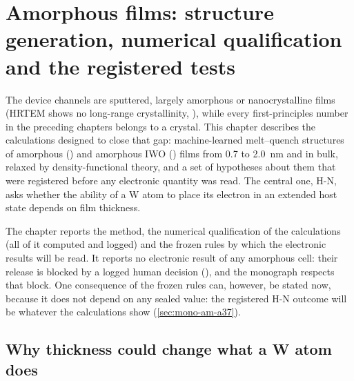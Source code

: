 \chapter{Amorphous films: structure generation, numerical qualification and the registered tests}
\label{ch:mono-amorph}

The device channels are sputtered, largely amorphous or nanocrystalline films (HRTEM shows no long-range crystallinity, \citealp[p.~2]{Januar2026}), while every
first-principles number in the preceding chapters belongs to a crystal. This chapter describes the calculations
designed to close that gap: machine-learned melt--quench structures of amorphous \InO{} (\aIO) and amorphous IWO
(\aIWO) films from 0.7 to 2.0~nm and in bulk, relaxed by density-functional theory, and a set of hypotheses about them
that were registered before any electronic quantity was read. The central one, H-N, asks whether the ability of a W
atom to place its electron in an extended host state depends on film thickness.

The chapter reports the method, the numerical qualification of the calculations (all of it computed and logged) and
the frozen rules by which the electronic results will be read. It reports no electronic result of any amorphous cell:
their release is blocked by a logged human decision (), and the monograph respects that block. One
consequence of the frozen rules can, however, be stated now, because it does not depend on any sealed value: the
registered H-N outcome will be  whatever the calculations show (\cref{sec:mono-am-a37}).

\section{Why thickness could change what a W atom does}
\label{sec:mono-am-why}

